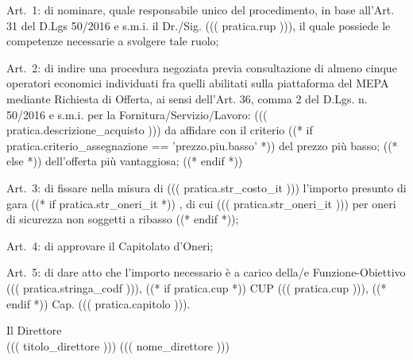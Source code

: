 \documentclass[a4paper,12pt]{letter}
\begin{document}
\begin{list}{VALUTATA}{}
\item[Art.~1:] di nominare, quale responsabile unico del procedimento, in base 
           all'Art. 31 del D.Lgs 50/2016 e s.m.i. il Dr./Sig. ((( pratica.rup ))),
           il quale possiede le competenze necessarie a svolgere tale ruolo; 
\item[Art.~2:] di indire una procedura negoziata previa consultazione di almeno cinque operatori
           economici individuati fra quelli abilitati
	   sulla piattaforma del MEPA mediante
           Richiesta di Offerta, ai sensi dell'Art. 36, comma 2 del D.Lgs. n. 50/2016 e s.m.i.
           per la Fornitura/Servizio/Lavoro: ((( pratica.descrizione_acquisto ))) da affidare con
           il criterio %
   ((* if pratica.criterio_assegnazione == 'prezzo.piu.basso' *)) %
del prezzo più basso;
   ((* else *)) %
dell'offerta più vantaggiosa;
   ((* endif *))

\item[Art.~3:] di fissare nella misura di ((( pratica.str_costo_it ))) l'importo presunto di gara%
((* if pratica.str_oneri_it *))%
, di cui ((( pratica.str_oneri_it ))) per oneri di sicurezza non soggetti a ribasso%
((* endif *));

\item[Art.~4:] di approvare il Capitolato d'Oneri;
\end{list}
\begin{minipage}{\linewidth}
\begin{list}{VALUTATA}{}
\item[Art.~5:] di dare atto che l'importo necessario è a carico della/e Funzione-Obiettivo ((( pratica.stringa_codf ))), ((* if pratica.cup *)) CUP ((( pratica.cup ))), ((* endif *)) Cap. ((( pratica.capitolo ))).
\end{list}
\vspace{10mm}

\begin{flushright}
\begin{minipage}[t]{6cm}
\begin{center}
Il Direttore \\
((( titolo_direttore ))) ((( nome_direttore )))
\end{center}
\end{minipage}
\end{flushright}
\end{minipage}
\end{document}
